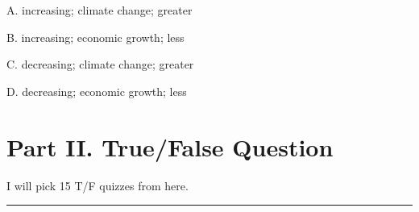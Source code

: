 \documentclass[
]{book}
\begin{document}
\begin{enumerate}
  A. increasing; climate change; greater

  B. increasing; economic growth; less

  C. decreasing; climate change; greater

  D. decreasing; economic growth; less
\end{enumerate}

\hypertarget{part-ii.-truefalse-question}{%
\section*{Part II. True/False Question}\label{part-ii.-truefalse-question}}

I will pick 15 T/F quizzes from here.

\begin{center}\rule{0.5\linewidth}{0.5pt}\end{center}
\end{document}
